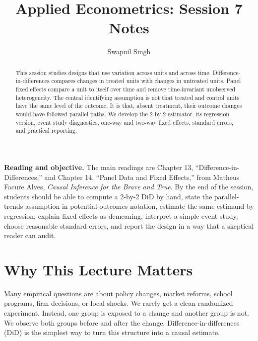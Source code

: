 

\title{Applied Econometrics: Session 7 Notes}
\author{Swapnil Singh}
\date{}


\setlength{\headheight}{26pt}


\maketitle

\begin{abstract}
This session studies designs that use variation across units and across time.
Difference-in-differences compares changes in treated units with changes in
untreated units. Panel fixed effects compare a unit to itself over time and
remove time-invariant unobserved heterogeneity. The central identifying
assumption is not that treated and control units have the same level of the
outcome. It is that, absent treatment, their outcome changes would have followed
parallel paths. We develop the 2-by-2 estimator, its regression version, event
study diagnostics, one-way and two-way fixed effects, standard errors, and
practical reporting.
\end{abstract}

\begin{boxD}
\textbf{Reading and objective.} The main readings are Chapter 13,
``Difference-in-Differences,'' and Chapter 14, ``Panel Data and Fixed Effects,''
from Matheus Facure Alves, \emph{Causal Inference for the Brave and True}. By
the end of the session, students should be able to compute a 2-by-2 DiD by hand,
state the parallel-trends assumption in potential-outcomes notation, estimate
the same estimand by regression, explain fixed effects as demeaning, interpret a
simple event study, choose reasonable standard errors, and report the design in
a way that a skeptical reader can audit.
\end{boxD}

\section{Why This Lecture Matters}

Many empirical questions are about policy changes, market reforms, school
programs, firm decisions, or local shocks. We rarely get a clean randomized
experiment. Instead, one group is exposed to a change and another group is not.
We observe both groups before and after the change. Difference-in-differences
(DiD) is the simplest way to turn this structure into a causal estimate.

